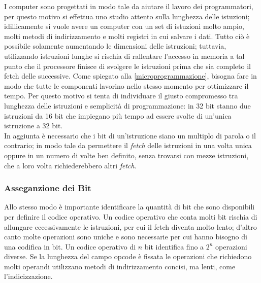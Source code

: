 \documentclass{article}
\begin{document}
I computer sono progettati in modo tale da aiutare il lavoro dei programmatori, per questo motivo si effettua uno studio attento sulla lunghezza delle istuzioni; idillicamente si vuole avere un computer con un set di istuzioni molto ampio, molti metodi di indirizzamento e molti registri in cui salvare i dati. Tutto ciò è possibile solamente aumentando le dimensioni delle istruzioni; tuttavia, utilizzando istruzioni lunghe si rischia di rallentare l'accesso in memoria a tal punto che il processore finisce di svolgere le istruzioni prima che sia completo il fetch delle successive. Come spiegato alla \autoref{microprogrammazione}, bisogna fare in modo che tutte le componenti lavorino nello stesso momento per ottimizzare il tempo. Per questo motivo si tenta di individuare il giusto compromesso tra lunghezza delle istruzioni e semplicità di programmazione: in 32 bit stanno due istruzioni da 16 bit che impiegano più tempo ad essere svolte di un'unica istruzione a 32 bit.\\
In aggiunta è necessario che i bit di un'istruzione siano un multiplo di parola o il contrario; in modo tale da permettere il \textit{fetch} delle istruzioni in una volta unica oppure in un numero di volte ben definito, senza trovarsi con mezze istruzioni, che a loro volta richiederebbero altri \textit{fetch}.

\subsubsection{Asseganzione dei Bit}

Allo stesso modo è importante identificare la quantità di bit che sono disponibili per definire il codice operativo. Un codice operativo che conta molti bit rischia di allungare eccessivamente le istruzioni, per cui il fetch diventa molto lento; d'altro canto molte operazioni sono uniche e sono necessarie per cui hanno bisogno di una codifica in bit. Un codice operativo di $n$ bit identifica fino a $2^n$ operazioni diverse. Se la lunghezza del campo opcode è fissata le operazioni che richiedono molti operandi utilizzano metodi di indirizzamento concisi, ma lenti, come l'indicizzazione.
\end{document}
